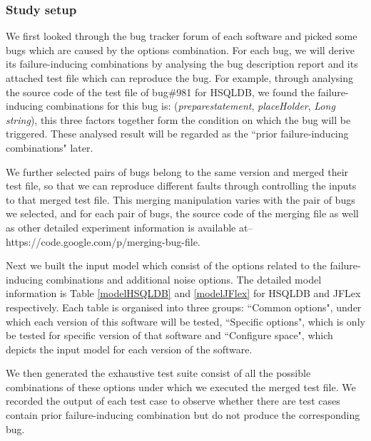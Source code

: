 \documentclass{sig-alternate}
\begin{document}


\subsubsection{Study setup}
We first looked through the bug tracker forum of each software and picked some bugs which are caused by the options combination. For each bug, we will derive its failure-inducing combinations by analysing the bug description report and its attached test file which can reproduce the bug. For example, through analysing the source code of the test file of bug\#981 for HSQLDB, we found the failure-inducing combinations for this bug is: (\emph{preparestatement}, \emph{placeHolder}, \emph{Long string}), this three factors together form the condition on which the bug will be triggered. These analysed result will be regarded as the ``prior failure-inducing combinations" later.

We further selected pairs of bugs belong to the same version and merged their test file, so that we can reproduce different faults through controlling the inputs to that merged test file. This merging manipulation varies with the pair of bugs we selected, and for each pair of bugs, the source code of the merging file as well as other detailed experiment information is available at-- https://code.google.com/p/merging-bug-file.

Next we built the input model which consist of the options related to the failure-inducing combinations and additional noise options. The detailed model information is Table \ref{modelHSQLDB} and \ref{modelJFlex} for HSQLDB and JFLex respectively. Each table is organised into three groups: ``Common options", under which each version of this software will be tested, ``Specific options", which is only be tested for specific version of that software and ``Configure space", which depicts the input model for each version of the software.

We then generated the exhaustive test suite consist of all the possible combinations of these options under which we executed the merged test file. We recorded the output of each test case to observe whether there are test cases contain prior failure-inducing combination but do not produce the corresponding bug.
\end{document}
